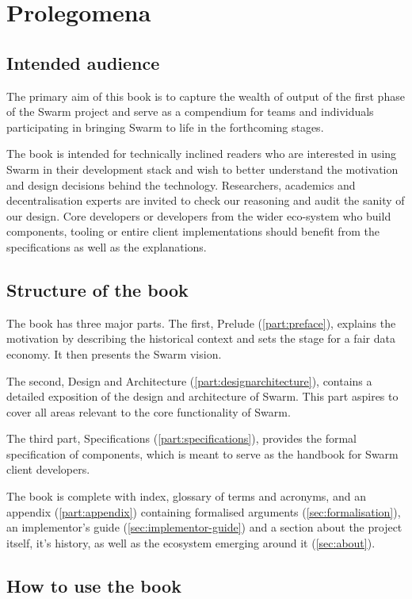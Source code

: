 \chapter{Prolegomena \statusgreen}
\green{}
\section*{Intended audience \statusgreen}
The primary aim of this book is to capture the wealth of output of the first phase of the Swarm project and serve as a compendium for teams and individuals participating in bringing Swarm to life in the forthcoming stages.

The book is intended for technically inclined readers who are interested in using Swarm in their development stack and wish to better understand the motivation and design decisions behind the technology. Researchers, academics and decentralisation experts are invited to check our reasoning and audit the sanity of our design. Core developers or developers from the wider eco-system who build components, tooling or entire client implementations should benefit from the specifications as well as the explanations.

\section*{Structure of the book \statusgreen}

The book has three major parts. The first, Prelude (\ref{part:preface}), explains the motivation by describing the historical context and sets the stage for a fair data economy. It then presents the Swarm vision.

The second, Design and Architecture (\ref{part:designarchitecture}), contains a detailed exposition of the design and architecture of Swarm. This part aspires to cover all areas relevant to the core functionality of Swarm.

The third part, Specifications (\ref{part:specifications}), provides the formal specification of components, which is meant to serve as the handbook for Swarm client developers.

The book is complete with index, glossary of terms and acronyms, and an appendix (\ref{part:appendix}) containing formalised arguments (\ref{sec:formalisation}), an implementor's guide (\ref{sec:implementor-guide}) and a section about the project itself, it's history, as well as the ecosystem emerging around it (\ref{sec:about}).

\section*{How to use the book \statusgreen}

